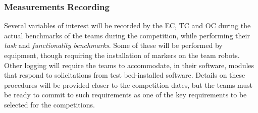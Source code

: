 \subsubsection{Measurements Recording}
\label{par:CompMeasurements}

Several variables of interest will be recorded by the EC, TC and OC during the actual benchmarks of the teams during the competition, while performing their \emph{task} and \emph{functionality benchmarks}. Some of these will be performed by \erlir equipment, though requiring the installation of markers on the team robots. Other logging will require the teams to accommodate, in their software, modules that respond to solicitations from test bed-installed software. 
Details on these procedures will be provided closer to the competition dates, but the teams must be ready to commit to such requirements as one of the key requirements to be selected for the \erlir competitions.
